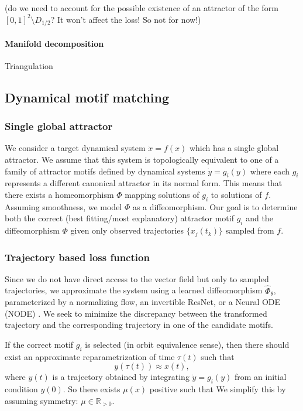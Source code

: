 \documentclass{article}
\newcommand{\ascomment}[1]{\textcolor{ascolor}{(#1)}}
\theoremstyle{definition} \newtheorem{definition}{Definition}  \newtheorem{example}{Example}
\theoremstyle{remark} \newtheorem{remark}{Remark}
\newcommand{\reals}{\mathbb{R}}
\newcounter{ct}
\begin{document}
\ascomment{do we need to account for the possible existence of an attractor of the form $[0,1]^2\setminus D_{1/2}$? It won't affect the loss! So not for now!}


\paragraph{Manifold decomposition}
Triangulation

\subsection{Dynamical motif matching}
\subsubsection{Single global attractor}
We consider a target dynamical system $\dot{x} = f(x)$ which has a single global attractor.
 We assume that this system is topologically equivalent to one of a family of attractor motifs defined by dynamical systems $\dot{y} = g_i(y)$ where each $g_i$ represents a different canonical attractor in its normal form.
  This means that there exists a homeomorphism $\Phi$ mapping solutions of $g_i$ to solutions of $f$.
  Assuming smoothness, we model $\Phi$ as a diffeomorphism.
Our goal is to determine both the correct (best fitting/most explanatory) attractor motif $g_i$ and the diffeomorphism $\Phi$ given only observed trajectories $\{x_j(t_k)\}$ sampled from $f$.


\subsubsection{Trajectory based loss function}
Since we do not have direct access to the vector field but only to sampled trajectories, we approximate the system using a learned diffeomorphism \( \hat{\Phi}_\theta \), parameterized by a normalizing flow\citep{kobyzev2020normalizing,papamakarios2021normalizing}, an invertible ResNet\citep{he2016deep}, or a Neural ODE (NODE) \citep{chen2018neural}.
 We seek to minimize the discrepancy between the transformed trajectory and the corresponding trajectory in one of the candidate motifs.

 If the correct motif \( g_i \) is selected (in orbit equivalence sense), then there should exist an approximate reparametrization of time \( \tau(t) \) such that
\[
y(\tau(t)) \approx x(t),
\]
where \( y(t) \) is a trajectory obtained by integrating \( \dot{y} = g_i(y) \) from an initial condition \( y(0) \). 
So there exists $\mu(x)$ positive such that 
We simplify this by assuming symmetry: $\mu\in\reals_{>0}$.
\end{document}
